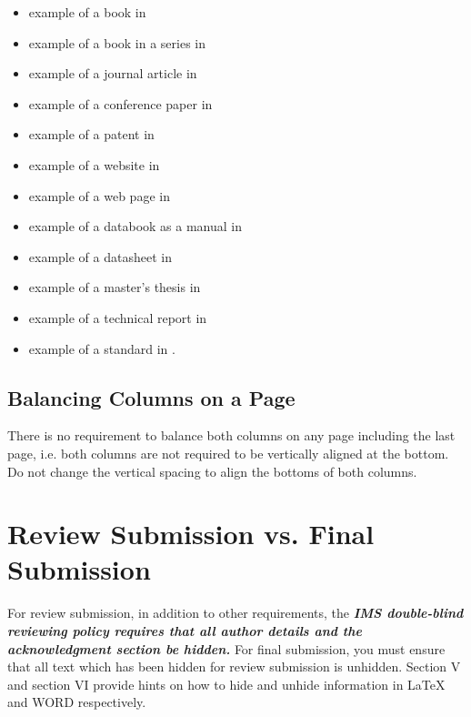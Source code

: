 \documentclass[conference,10pt,letterpaper]{IEEEtran}%
\begin{document}
\begin{itemize}
\item	example of a book in \cite{IEEEexample:book}
\item	example of a book in a series in \cite{IEEEexample:bookwithseriesvolume}
\item	example of a journal article in \cite{IEEEexample:article_typical}
\item	example of a conference paper in \cite{IEEEexample:confwithpaper}
\item	example of a patent in \cite{IEEEexample:uspat}
\item	example of a website in \cite{IEEEexample:IEEEwebsite}
\item	example of a web page in \cite{IEEEexample:shellCTANpage}
\item	example of a databook as a manual in \cite{IEEEexample:motmanual}
\item	example of a datasheet in \cite{IEEEexample:datasheet}
\item	example of a master's thesis in \cite{IEEEexample:masterstype}
\item	example of a technical report in \cite{IEEEexample:techreptype}
\item	example of a standard in \cite{IEEEexample:standard}.
\end{itemize}


\subsection{Balancing Columns on a Page}

There is no requirement to balance both columns on any page including
the last page, i.e. both columns are not required to be vertically
aligned at the bottom. Do not change the vertical spacing to align the
bottoms of both columns.


\section{Review Submission vs. Final Submission}

For review submission, in addition to other requirements, the
{\bfseries\itshape IMS double-blind reviewing policy requires that
all author details and the acknowledgment section be hidden.}
For final submission, you must ensure that all text which has been
hidden for review submission is unhidden.  Section V and section VI
provide hints on how to hide and unhide information in LaTeX and WORD
respectively.
\end{document}

